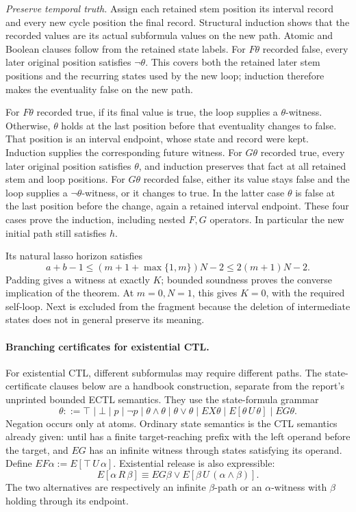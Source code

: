 \emph{Preserve temporal truth.}
Assign each retained stem position its interval record
and every new cycle position the final record. Structural
induction shows that the recorded values are its actual
subformula values on the new path. Atomic and Boolean
clauses follow from the retained state labels. For
\(F\theta\) recorded false, every later original position
satisfies \(\neg\theta\). This covers both the retained
later stem positions and the recurring states used by
the new loop; induction therefore makes the eventuality
false on the new path.

For \(F\theta\) recorded true, if its final value is true,
the loop supplies a \(\theta\)-witness. Otherwise,
\(\theta\) holds at the last position before that
eventuality changes to false. That position is an
interval endpoint, whose state and record were kept.
Induction supplies the corresponding future witness.
For \(G\theta\) recorded true, every later original
position satisfies \(\theta\), and induction preserves
that fact at all retained stem and loop positions.
For \(G\theta\) recorded false, either its value stays
false and the loop supplies a \(\neg\theta\)-witness,
or it changes to true. In the latter case \(\theta\)
is false at the last position before the change,
again a retained interval endpoint.
These four cases prove the induction, including nested
\(F,G\) operators. In particular the new initial path
still satisfies \(h\).

Its natural lasso horizon satisfies
\[
 a+b-1
 \leq (m+1+\max\{1,m\})N-2
 \leq 2(m+1)N-2.
\]
Padding gives a witness at exactly \(K\); bounded
soundness proves the converse implication of the theorem.
At \(m=0,N=1\), this gives \(K=0\), with the required
self-loop. Next is excluded from the fragment because
the deletion of intermediate states does not in general
preserve its meaning.

\paragraph{Branching certificates for existential CTL.}
\label{sec:p09-n-c-017-biere-ectl-certificates}
For existential CTL, different subformulas may require
different paths. The state-certificate clauses below are a
handbook construction, separate from the report's unprinted
bounded ECTL semantics. They use the state-formula grammar
\[
 \theta::=\top\mid\bot\mid p\mid\neg p
 \mid\theta\land\theta\mid\theta\lor\theta
 \mid EX\theta\mid E[\theta\,U\,\theta]\mid EG\theta.
\]
Negation occurs only at atoms. Ordinary state semantics
is the CTL semantics already given: until has a finite
target-reaching prefix with the left operand before
the target, and \(EG\) has an infinite witness through
states satisfying its operand. Define
\(EF\alpha:=E[\top\,U\,\alpha]\).
Existential release is also expressible:
\[
 E[\alpha\,R\,\beta]
 \equiv EG\beta\lor E[\beta\,U\,(\alpha\land\beta)].
\]
The two alternatives are respectively an infinite
\(\beta\)-path or an \(\alpha\)-witness with \(\beta\)
holding through its endpoint.

